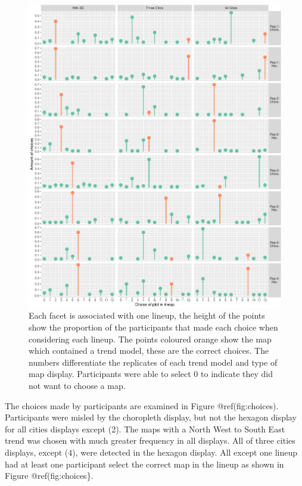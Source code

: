 \documentclass[conference,final,]{IEEEtran}
\makeatletter
\def\maxwidth{\ifdim\Gin@nat@width>\linewidth\linewidth
\else\Gin@nat@width\fi}
\let\Oldincludegraphics\includegraphics
\renewcommand{\includegraphics}[1]{\Oldincludegraphics[width=\maxwidth]{#1}}
\makeatother
\begin{document}
\begin{figure}
\centering
\includegraphics{paper_files/figure-latex/choices-1.pdf}
\caption{Each facet is associated with one lineup, the height of the
points show the proportion of the participants that made each choice
when considering each lineup. The points coloured orange show the map
which contained a trend model, these are the correct choices. The
numbers differentiate the replicates of each trend model and type of map
display. Participants were able to select 0 to indicate they did not
want to choose a map.}
\end{figure}

The choices made by participants are examined in Figure
@ref(fig:choices). Participants were misled by the choropleth display,
but not the hexagon display for all cities displays except (2). The maps
with a North West to South East trend was chosen with much greater
frequency in all displays. All of three cities displays, except (4),
were detected in the hexagon display. All except one lineup had at least
one participant select the correct map in the lineup as shown in Figure
@ref(fig:choices\}.
\end{document}
